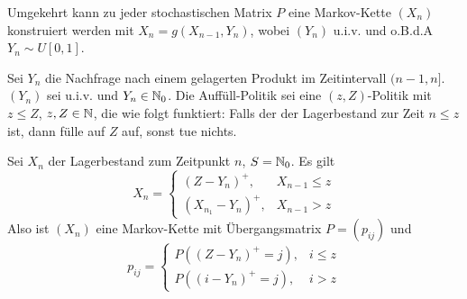 \documentclass[a4paper,twoside,DIV15,BCOR12mm]{scrbook}
\begin{document}
\begin{bemerkung}
Umgekehrt kann zu jeder stochastischen Matrix $P$ eine Markov-Kette $(X_n)$ konstruiert werden mit $X_n=g(X_{n-1},Y_n)$, wobei $(Y_n)$ u.i.v. und o.B.d.A $Y_n \sim U[0,1]$.
\end{bemerkung}

\begin{beispiel}[Lagerhaltung]
Sei $Y_n$ die Nachfrage nach einem gelagerten Produkt im Zeitintervall $(n-1,n]$. $(Y_n)$ sei u.i.v. und $Y_n\in \mathbb{N}_0$. Die Auffüll-Politik sei eine $(z,Z)$-Politik mit $z\le Z$, $z,Z\in \mathbb{N}$, die wie folgt funktiert: Falls der der Lagerbestand zur Zeit $n\le z$ ist, dann fülle auf $Z$ auf, sonst tue nichts.

Sei $X_n$ der Lagerbestand zum Zeitpunkt $n$, $S=\mathbb{N}_0$. Es gilt
\[
X_n =
\begin{cases}
(Z - Y_n)^+, & X_{n-1} \le z \\
(X_{n_1} - Y_n)^+, & X_{n-1} > z
\end{cases}
\]
Also ist $(X_n)$ eine Markov-Kette mit Übergangsmatrix $P=(p_{ij})$ und
\[
p_{ij} = 
\begin{cases}
P( (Z-Y_n)^+ = j), & i\le z \\
P( (i-Y_n)^+ = j), & i > z
\end{cases}
\]
\end{beispiel}
\end{document}
